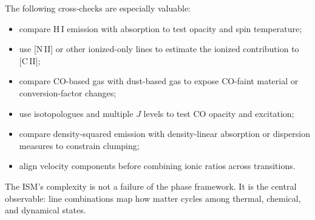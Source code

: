 The following cross-checks are especially valuable:
\begin{itemize}
 \item compare H\,I emission with absorption to test opacity and spin temperature;
 \item use [N\,II] or other ionized-only lines to estimate the ionized contribution
 to [C\,II];
 \item compare CO-based gas with dust-based gas to expose CO-faint material or
 conversion-factor changes;
 \item use isotopologues and multiple $J$ levels to test CO opacity and excitation;
 \item compare density-squared emission with density-linear absorption or dispersion
 measures to constrain clumping;
 \item align velocity components before combining ionic ratios across transitions.
\end{itemize}
The ISM's complexity is not a failure of the phase framework.  It is the central
observable: line combinations map how matter cycles among thermal, chemical, and
dynamical states.
